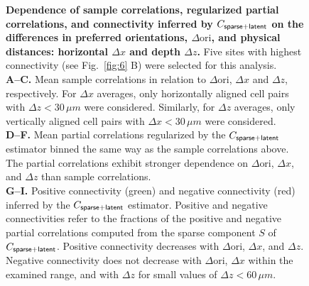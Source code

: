 \begin{figure}
\caption{
{\bf Dependence of sample correlations, regularized partial correlations, and connectivity inferred by $C_{\sf sparse+latent}$ on the differences in preferred orientations, $\Delta \mbox{ori}$, and physical distances: horizontal $\Delta x$ and depth $\Delta z$.} 
Five sites with highest connectivity (see Fig.~\ref{fig:6} B) were selected for this analysis.
\\
{\bf A--C.} Mean sample correlations in relation to $\Delta\mbox{ori}$,  $\Delta x$ and $\Delta z$, respectively. For $\Delta x$ averages, only horizontally aligned cell pairs with $\Delta z<30\,\mu m$ were considered. Similarly, for $\Delta z$ averages, only vertically aligned cell pairs with $\Delta x<30\,\mu m$ were considered.
\\
{\bf D--F.} Mean partial correlations regularized by the $C_{\sf sparse+latent}$ estimator binned the same way as the sample correlations above. The partial correlations exhibit stronger dependence on $\Delta\mbox{ori}$, $\Delta x$, and $\Delta z$ than sample correlations. 
\\
{\bf G--I.} Positive connectivity (green) and negative connectivity (red) inferred by the $C_{\sf sparse+latent}$ estimator. 
Positive and negative connectivities refer to the fractions of the positive and negative partial correlations computed from the sparse component $S$ of $C_{\sf sparse+latent}$.  
Positive connectivity decreases with $\Delta \mbox{ori}$, $\Delta x$, and $\Delta z$. 
Negative connectivity does not decrease with $\Delta \mbox{ori}$, $\Delta x$ within the examined range, and with $\Delta z$ for small values of $\Delta z<60\,\mu m$.
}
\label{fig:7}
\end{figure}

% 
%
%

